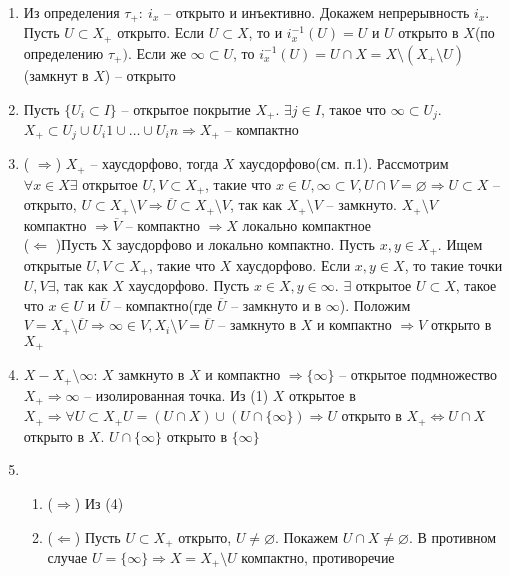 	\begin{enumerate}
		\item 
		Из определения ${\tau}_{+}:\ i_x$ -- открыто и инъективно. Докажем непрерывность $i_x$. Пусть $U\subset X_{+}$ открыто. Если $U\subset X$, то и $i_x^{-1}(U) = U$ и $U$ открыто в $X$(по определению ${\tau}_{+})$. Если же $\infty \subset U$, то $i_x^{-1}(U) = U\cap X=X\setminus (X_{+}\setminus U)$ (замкнут в $X$) -- открыто
		\item 
		Пусть $\{U_i \subset I\}$ -- открытое покрытие $X_{+}$. $\exists j\in I$, такое что $\infty \subset U_j$. $X_{+}\subset U_j \cup U_i1 \cup \ldots \cup U_in \Rightarrow X_{+}$ -- компактно
		\item 
		( $\Rightarrow$) $X_{+}$ -- хаусдорфово, тогда $X$ хаусдорфово(см. п.1). Рассмотрим $\forall x \in X \exists$ открытое $U, V \subset X_{+}$, такие что $x\in U, \infty \subset V, U\cap V=\varnothing \Rightarrow U \subset X$ -- открыто, $U\subset X_{+}\setminus V \Rightarrow \overline{U}\subset X_{+}\setminus V$, так как $X_{+}\setminus V$ -- замкнуто. $X_{+}\setminus V$ компактно $\Rightarrow \overline{V}$ -- компактно $\Rightarrow X$ локально компактное\\
		($\Leftarrow$ )Пусть X заусдорфово и локально компактно. Пусть $x,y \in X_{+}$. Ищем открытые $U, V\subset X_{+}$, такие что $X$ хаусдорфово. Если $x, y\in X$, то такие точки $U, V \exists$, так как $X$ хаусдорфово. Пусть $x\in X, y\in \infty$. $\exists$ открытое $U\subset X$, такое что $x\in U$ и $\overline{U}$ -- компактно(где $\overline{U}$ -- замкнуто и в $\infty$). Положим $V = X_{+}\setminus\overline{U} \Rightarrow \infty \in V, X_i\setminus V=\overline{U}$ -- замкнуто в $X$ и компактно $\Rightarrow V$ открыто в $X_{+}$
		\item 
		$X-X_{+}\setminus{\infty}$: $X$ замкнуто в $X$ и компактно $\Rightarrow \{\infty\}$ -- открытое подмножество $X_{+} \Rightarrow \infty$ -- изолированная точка. Из (1) $X$ открытое в $X_{+} \Rightarrow \forall U\subset X_{+} U = (U\cap X)\cup(U\cap\{\infty\}) \Rightarrow U$ открыто в $X_{+} \Leftrightarrow U\cap X$ открыто в $X$. $U\cap \{\infty\}$ открыто в $\{\infty\}$
		\item 
		\begin{enumerate}
			\item
			($\Rightarrow$) Из (4) 
			\item 
			($\Leftarrow$) Пусть $U\subset X_{+}$ открыто, $U \neq \varnothing$. Покажем $U\cap X\neq \varnothing$. В противном случае $U = \{\infty\} \Rightarrow X = X_{+}\setminus U$ компактно, противоречие
		\end{enumerate}		
	\end{enumerate}
